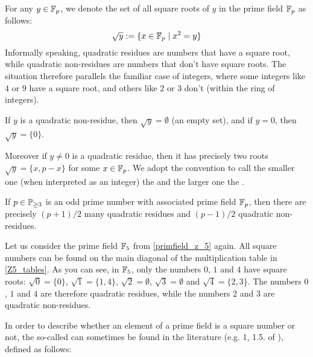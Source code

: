 For any $ y \in \mathbb{F}_p $, we denote the set of all square roots of $ y $ in the prime field $ \mathbb{F}_p $ as follows:
\begin{equation}
\label{ded:square_root}
\sqrt{y}: = \{x \in \mathbb{F}_p \; | \; x^2 = y \}
\end{equation}
Informally speaking, quadratic residues are numbers that have a square root, while quadratic non-residues are numbers that don't have square roots. The situation therefore parallels the familiar case of integers, where some integers like $4$ or $9$ have a square root, and others like $2$ or $3$ don't (within the ring of integers).

If $ y $ is a quadratic non-residue, then $ \sqrt{y} = \emptyset $ (an empty set), and if $ y = 0 $, then $ \sqrt{y} = \{0 \} $. 

Moreover if $y\neq 0$ is a quadratic residue, then it has precisely two roots $\sqrt{y}=\{x,p-x\}$ for some $x\in \mathbb{F}_p$. We adopt the convention to call the smaller one (when interpreted as an integer) the  and the larger one the . 

If $ p \in \mathbb{P}_{\geq 3} $ is an odd prime number with associated prime field $\mathbb{F}_p$, then there are precisely $(p+1)/2$ many quadratic residues and $(p-1)/2$ quadratic non-residues.

\begin{example} 
\label{example:quadratic_residue_F5}
Let us consider the prime field $\mathbb{F}_5$ from \examplename{} \ref{primfield_z_5} again. All square numbers can be found on the main diagonal of the multiplication table in  \eqref{Z5_tables}. As you can see, in $ \mathbb{F}_5 $, only the numbers $ 0 $, $ 1 $ and $ 4 $ have square roots: $ \sqrt{0} = \{0 \} $, $ \sqrt{1} = \{1,4 \} $, $ \sqrt{2} = \emptyset $, $ \sqrt{3} = \emptyset $ and $ \sqrt{4} = \{2,3 \} $. The numbers $0$, $1$ and $4$ are therefore quadratic residues, while the numbers $2$ and $3$ are quadratic non-residues.
\end{example}
In order to describe whether an element of a prime field is a square number  or not, the so-called  can sometimes be found in the literature (e.g. \chaptname{} 1, \secname{} 1.5. of \cite{cohen-2010}), defined as follows:

